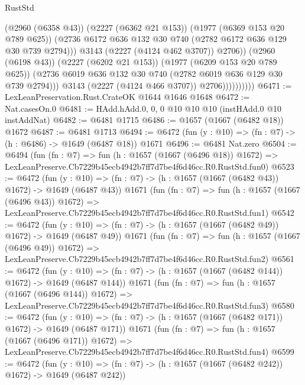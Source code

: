 \begin{lexlean}{RustStd}
\begin{coremodule}
                                (@2960 (@6358 @43))
                                (@2227 (@6362 @21 @153))
                                (@1977 (@6369 @153 @20 @789 @625))
                                (@2736
                                  @6172
                                  @636
                                  @132
                                  @30
                                  @740
                                  (@2782 @6172 @636 @129 @30 @739 @2794)))
                              @3143
                              (@2227 (@4124 @462 @3707))
                              @2706))
                          (@2960 (@6198 @43))
                          (@2227 (@6202 @21 @153))
                          (@1977 (@6209 @153 @20 @789 @625))
                          (@2736 @6019 @636 @132 @30 @740 (@2782 @6019 @636 @129 @30 @739 @2794)))
                        @3143
                        (@2227 (@4124 @466 @3707))
                        @2706))))))))))
@6471 := LexLeanPreservation.Rust.CrateOK @1644 @1646 @1648
@6472 := Nat.casesOn.{0}
@6481 := HAdd.hAdd.{0, 0, 0} @10 @10 @10 (instHAdd.{0} @10 instAddNat)
@6482 := @6481 @1715
@6486 := @1657 (@1667 (@6482 @18)) @1672
@6487 := @6481 @1713
@6494 := @6472 (fun (y : @10) => (fn : @7) -> (h : @6486) -> @1649 (@6487 @18)) @1671
@6496 := @6481 Nat.zero
@6504 := @6494
    (fun (fn : @7) =>
    fun (h : @1657 (@1667 (@6496 @18)) @1672) =>
    LexLeanPreserve.Cb7229b45ecb4942b7ff7d7be4f6d46cc.R0.RustStd.fun0)
@6523 := @6472
    (fun (y : @10) => (fn : @7) -> (h : @1657 (@1667 (@6482 @43)) @1672) -> @1649 (@6487 @43))
    @1671
    (fun (fn : @7) =>
    fun (h : @1657 (@1667 (@6496 @43)) @1672) =>
    LexLeanPreserve.Cb7229b45ecb4942b7ff7d7be4f6d46cc.R0.RustStd.fun1)
@6542 := @6472
    (fun (y : @10) => (fn : @7) -> (h : @1657 (@1667 (@6482 @49)) @1672) -> @1649 (@6487 @49))
    @1671
    (fun (fn : @7) =>
    fun (h : @1657 (@1667 (@6496 @49)) @1672) =>
    LexLeanPreserve.Cb7229b45ecb4942b7ff7d7be4f6d46cc.R0.RustStd.fun2)
@6561 := @6472
    (fun (y : @10) => (fn : @7) -> (h : @1657 (@1667 (@6482 @144)) @1672) -> @1649 (@6487 @144))
    @1671
    (fun (fn : @7) =>
    fun (h : @1657 (@1667 (@6496 @144)) @1672) =>
    LexLeanPreserve.Cb7229b45ecb4942b7ff7d7be4f6d46cc.R0.RustStd.fun3)
@6580 := @6472
    (fun (y : @10) => (fn : @7) -> (h : @1657 (@1667 (@6482 @171)) @1672) -> @1649 (@6487 @171))
    @1671
    (fun (fn : @7) =>
    fun (h : @1657 (@1667 (@6496 @171)) @1672) =>
    LexLeanPreserve.Cb7229b45ecb4942b7ff7d7be4f6d46cc.R0.RustStd.fun4)
@6599 := @6472
    (fun (y : @10) => (fn : @7) -> (h : @1657 (@1667 (@6482 @242)) @1672) -> @1649 (@6487 @242))

\end{coremodule}
\end{lexlean}
